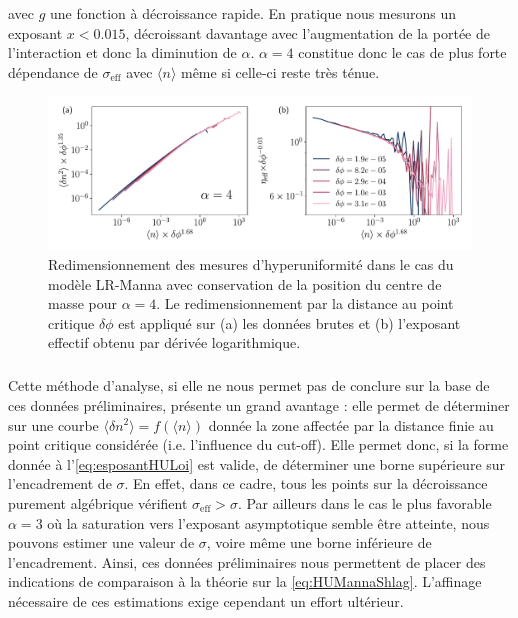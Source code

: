 \noindent avec $g$ une fonction à décroissance rapide. En pratique nous mesurons un exposant $x < 0.015$, décroissant davantage avec l'augmentation de la portée de l'interaction et donc la diminution de $\alpha$. $\alpha=4$ constitue donc le cas de plus forte dépendance de $\sigma_\text{eff}$ avec $\langle n \rangle$ même si celle-ci reste très ténue. 

\begin{figure}[h]
	\centering
	\includegraphics[width=\textwidth]{Chapitre2/Figures/Hyperuniformity/RescaleHU_MannaCM_Gamma4.pdf}
	\caption{Redimensionnement des mesures d'hyperuniformité dans le cas du modèle LR-Manna avec conservation de la position du centre de masse pour $\alpha=4$. Le redimensionnement par la distance au point critique $\delta\phi$ est appliqué sur (a) les données brutes et (b) l'exposant effectif obtenu par dérivée logarithmique.}
	\label{fig:MannaCMHU_rescale_gamma4}
\end{figure}

\subparagraph{}Cette méthode d'analyse, si elle ne nous permet pas de conclure sur la base de ces données préliminaires, présente un grand avantage : elle permet de déterminer sur une courbe $\langle  \delta n^2 \rangle  = f(\langle n \rangle )$ donnée la zone affectée par la distance finie au point critique considérée (i.e. l'influence du cut-off). Elle permet donc, si la forme donnée à l'\autoref{eq:esposantHULoi} est valide, de déterminer une borne supérieure sur l'encadrement de $\sigma$. En effet, dans ce cadre, tous les points sur la décroissance purement algébrique vérifient $\sigma_\text{eff}>\sigma$. Par ailleurs dans le cas le plus favorable $\alpha=3$ où la saturation vers l'exposant asymptotique semble être atteinte, nous pouvons estimer une valeur de $\sigma$, voire même une borne inférieure de l'encadrement. Ainsi, ces données préliminaires nous permettent de placer des indications de comparaison à la théorie sur la \autoref{eq:HUMannaShlag}. L'affinage nécessaire de ces estimations exige cependant un effort ultérieur.

